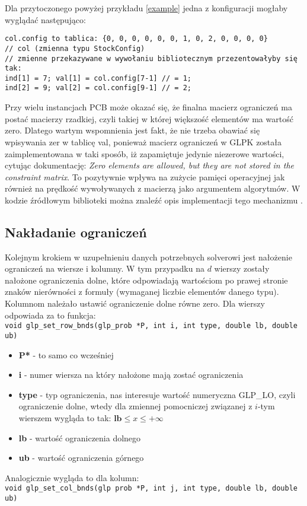 Dla przytoczonego powyżej przykładu \ref{example} jedna z konfiguracji mogłaby wyglądać następująco:

\begin{lstlisting}
col.config to tablica: {0, 0, 0, 0, 0, 0, 1, 0, 2, 0, 0, 0, 0}            
// col (zmienna typu StockConfig)	
// zmienne przekazywane w wywołaniu bibliotecznym przezentowałyby się tak: 
ind[1] = 7; val[1] = col.config[7-1] // = 1; 
ind[2] = 9; val[2] = col.config[9-1] // = 2; 
\end{lstlisting}


Przy wielu instancjach PCB może okazać się, że finalna macierz ograniczeń ma postać macierzy rzadkiej, czyli takiej w której większość elementów ma wartość zero. Dlatego wartym wspomnienia jest fakt, że nie trzeba obawiać się wpisywania zer w tablicę val, ponieważ macierz ograniczeń w GLPK została zaimplementowana w taki sposób, iż zapamiętuje jedynie niezerowe wartości, cytując dokumentację: \textit{Zero elements are allowed, but they are not stored in the constraint matrix}. To pozytywnie wpływa na zużycie pamięci operacyjnej jak również na prędkość wywoływanych z macierzą jako argumentem algorytmów. W kodzie źródłowym biblioteki można znaleźć opis implementacji tego mechanizmu \cite{GLPK_SRC}.

\subsection{Nakładanie ograniczeń}
Kolejnym krokiem w uzupełnieniu danych potrzebnych solverowi jest nałożenie ograniczeń na  wiersze i kolumny. W tym przypadku na $d$ wierszy zostały nałożone ograniczenia dolne, które odpowiadają wartościom po prawej stronie znaków nierówności z formuły (wymaganej liczbie elementów danego typu). Kolumnom należało ustawić ograniczenie dolne równe zero.
Dla wierszy odpowiada za to funkcja: \\
\verb|void glp_set_row_bnds(glp_prob *P, int i, int type, double lb, double ub)|
\begin{itemize}
	\item \textbf{P*} - to samo co wcześniej
	\item \textbf{i} - numer wiersza na który nałożone mają zostać ograniczenia
	\item \textbf{type} - typ ograniczenia, nas interesuje wartość numeryczna GLP\_LO, czyli ograniczenie dolne, wtedy dla zmiennej pomocniczej związanej z $i$-tym wierszem wygląda to tak: $\mathbf{lb} \leq x \le +\infty$
	\item \textbf{lb} - wartość ograniczenia dolnego
	\item \textbf{ub} - wartość ograniczenia górnego
\end{itemize}
Analogicznie wygląda to dla kolumn: \\
\verb|void glp_set_col_bnds(glp prob *P, int j, int type, double lb, double ub)|

